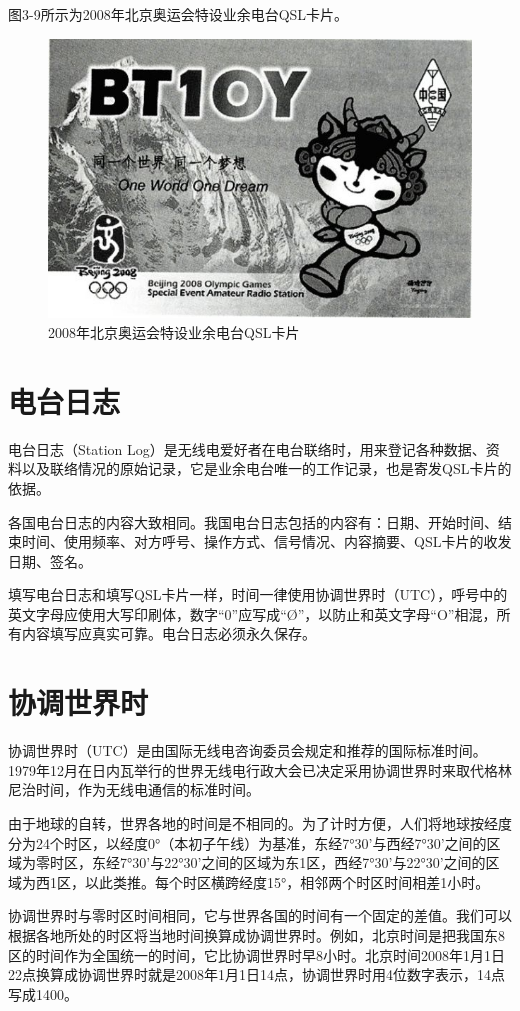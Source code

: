 \documentclass[12pt,UTF8]{ctexbook}
\begin{document}
图3-9所示为2008年北京奥运会特设业余电台QSL卡片。

\begin{figure}[htbp]
	\centering
	\includegraphics[width=0.7\linewidth]{43}
	\caption{2008年北京奥运会特设业余电台QSL卡片}
	\label{fig:1}
\end{figure}

\section{电台日志}

电台日志（Station Log）是无线电爱好者在电台联络时，用来登记各种数据、资料以及联络情况的原始记录，它是业余电台唯一的工作记录，也是寄发QSL卡片的依据。

各国电台日志的内容大致相同。我国电台日志包括的内容有：日期、开始时间、结束时间、使用频率、对方呼号、操作方式、信号情况、内容摘要、QSL卡片的收发日期、签名。

填写电台日志和填写QSL卡片一样，时间一律使用协调世界时（UTC），呼号中的英文字母应使用大写印刷体，数字“0”应写成“Ø”，以防止和英文字母“O”相混，所有内容填写应真实可靠。电台日志必须永久保存。

\section{协调世界时}

协调世界时（UTC）是由国际无线电咨询委员会规定和推荐的国际标准时间。1979年12月在日内瓦举行的世界无线电行政大会已决定采用协调世界时来取代格林尼治时间，作为无线电通信的标准时间。

由于地球的自转，世界各地的时间是不相同的。为了计时方便，人们将地球按经度分为24个时区，以经度0°（本初子午线）为基准，东经7°30'与西经7°30'之间的区域为零时区，东经7°30'与22°30'之间的区域为东1区，西经7°30'与22°30'之间的区域为西1区，以此类推。每个时区横跨经度15°，相邻两个时区时间相差1小时。

协调世界时与零时区时间相同，它与世界各国的时间有一个固定的差值。我们可以根据各地所处的时区将当地时间换算成协调世界时。例如，北京时间是把我国东8区的时间作为全国统一的时间，它比协调世界时早8小时。北京时间2008年1月1日22点换算成协调世界时就是2008年1月1日14点，协调世界时用4位数字表示，14点写成1400。
\end{document}
